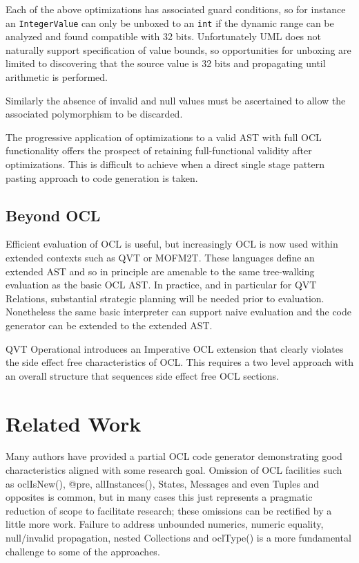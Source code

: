 \documentclass{sig-alternate}
\begin{document}
Each of the above optimizations has associated guard conditions, so for instance an \verb|IntegerValue| can only be unboxed to an \verb|int| if the dynamic range can be analyzed and found compatible with 32 bits. Unfortunately UML does not naturally support specification of value bounds, so opportunities for unboxing are limited to discovering that the source value is 32 bits and propagating until arithmetic is performed.

Similarly the absence of invalid and null values must be ascertained to allow the associated polymorphism to be discarded.

The progressive application of optimizations to a valid AST with full OCL functionality offers the prospect of retaining full-functional validity after optimizations. This is difficult to achieve when a direct single stage pattern pasting approach to code generation is taken. 

\subsection{Beyond OCL}

Efficient evaluation of OCL is useful, but increasingly OCL is now used within extended contexts such as QVT\cite{QVT-1.1} or MOFM2T\cite{MOFM2T}.
These languages define an extended AST and so in principle are amenable to the same tree-walking evaluation as the basic OCL AST. In practice, and in particular for QVT Relations, substantial strategic planning will be needed prior to evaluation. Nonetheless the same basic interpreter can support naive evaluation and the code generator can be extended to the extended AST.

QVT Operational introduces an Imperative OCL extension that clearly violates the side effect free characteristics of OCL.
This requires a two level approach with an overall structure that sequences side effect free
OCL sections.  

\section{Related Work}

Many authors have provided a partial OCL code generator demonstrating good characteristics aligned with some research goal. Omission of OCL facilities such as oclIsNew(), @pre,  allInstances(), States, Messages and even Tuples and opposites is common, but in many cases this just represents a pragmatic reduction of scope to facilitate research; these omissions can be rectified by a little more work. Failure to address unbounded numerics, numeric equality, null/invalid propagation, nested Collections and oclType() is a more fundamental challenge to some of the approaches. 
\end{document}
